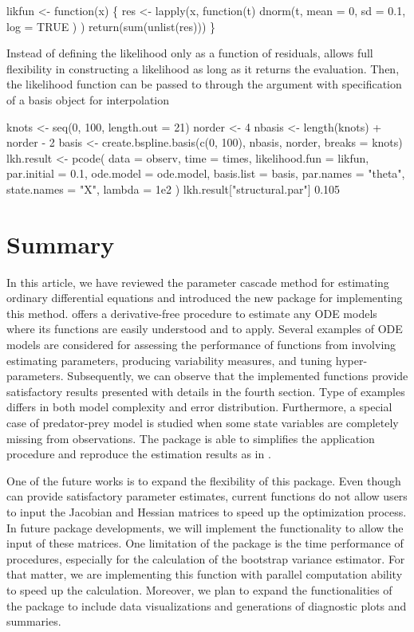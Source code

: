\begin{example*}
likfun <- function(x) \{
  res <- lapply(x, function(t) {
    dnorm(t,
      mean = 0,
      sd = 0.1, log = TRUE
    )
  })
  return(sum(unlist(res)))
\}
\end{example*}
Instead of defining the likelihood only as a function of residuals,  allows full flexibility in constructing a likelihood as long as it returns the evaluation. Then, the likelihood function can be passed to  through the argument  with specification of a basis object for interpolation
\begin{example*}
knots <- seq(0, 100, length.out = 21)
norder <- 4
nbasis <- length(knots) + norder - 2
basis <- create.bspline.basis(c(0, 100), nbasis, norder, breaks = knots)
lkh.result <- pcode(
  data = observ, time = times, likelihood.fun = likfun,
  par.initial = 0.1, ode.model = ode.model,
  basis.list = basis, par.names = "theta", state.names = "X", lambda = 1e2
)
lkh.result["structural.par"]
0.105                  
\end{example*}
\section{Summary} \label{sec:summary}
In this article, we have reviewed the parameter cascade method for estimating ordinary differential equations and introduced the new package  for implementing this method.  offers a derivative-free procedure to estimate any ODE models where its functions are easily understood and to apply.  Several examples of ODE models are considered for assessing the performance of functions from  involving estimating parameters, producing variability measures, and tuning hyper-parameters. Subsequently, we can observe that the implemented functions provide satisfactory results presented with details in the fourth section. Type of examples differs in both model complexity and error distribution. Furthermore, a special case of predator-prey model is studied when some state variables are completely missing from observations. The package is able to simplifies the application procedure and reproduce the estimation results as in \cite{Jiguo}. 

One of the future works is to expand the flexibility of this package. Even though  can provide satisfactory parameter estimates, current functions do not allow users to input the Jacobian and Hessian matrices to speed up the optimization process. In future package developments, we will implement the functionality to allow the input of these matrices. One limitation of the package is the time performance of procedures, especially for the calculation of the bootstrap variance estimator. For that matter, we are implementing this function with parallel computation ability to speed up the calculation. Moreover, we plan to expand the functionalities of the package to include data visualizations and generations of diagnostic plots and summaries.


